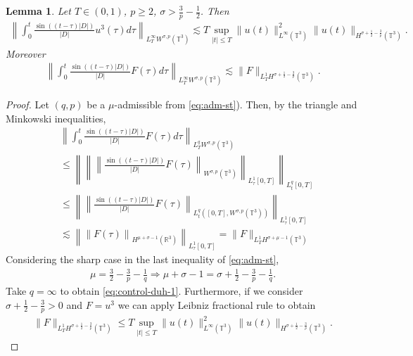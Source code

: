 \documentclass[a4paper, reqno, 11pt]{amsart}
\newtheorem{lemma}[theorem]{Lemma}
\theoremstyle{definition}
\begin{document}
	\begin{lemma}\label{lemma:infcontrol-duhamel-st}
	Let $T \in (0,1)$, $p \geq 2$, $\sigma > \frac{3}{p} - \frac{1}{2}$. Then
		\begin{align}\label{eq:control-duh}
			\left\| \int_0^t \frac{\sin((t-\tau)|D|)}{|D|} u^3(\tau) d\tau \right\|_{L^{\infty}_T W^{\sigma,p}(\mathbb{T}^3)} \lesssim T \sup_{|t| \leq T} \| u(t) \|_{L^{\infty}(\mathbb{T}^3)}^2 \|u(t)\|_{H^{\sigma + \frac{1}{2} - \frac{3}{p}}(\mathbb{T}^3)}.
		\end{align}
		Moreover
		\begin{align}\label{eq:control-duh-1}
		\left\| \int_0^t \frac{\sin((t-\tau)|D|)}{|D|} F(\tau) d\tau \right\|_{L^{\infty}_T W^{\sigma,p}(\mathbb{T}^3)} \lesssim  \|F\|_{L^1_T H^{\sigma + \frac{1}{2} - \frac{3}{p}}(\mathbb{T}^3)}.
		\end{align}
	\end{lemma}
	\begin{proof}
	Let $(q,p)$ be a $\mu$-admissible from \eqref{eq:adm-st}). Then, by the triangle and Minkowski inequalities,
	\begin{align*}
			&\left\| \int_0^t \frac{\sin((t-\tau)|D|)}{|D|} F(\tau) d\tau \right\|_{L^q_T W^{\sigma,p}(\mathbb{T}^3)}  \nonumber\\
			&\leq \left\| \left\| \left\|\frac{\sin((t-\tau)|D|)}{|D|} F(\tau)\right\|_{W^{\sigma,p}(\mathbb{T}^3)} \right\|_{L^1_{\tau}[0,T]} \right\|_{L^q_t[0,T]}  \nonumber\\
			&\leq \left\|  \left\|\frac{\sin((t-\tau)|D|)}{|D|} F(\tau)\right\|_{L^q_t([0,T],W^{\sigma,p}(\mathbb{T}^3))}  \right\|_{L^1_{\tau}[0,T]} \nonumber\\
			&\lesssim \left\| \left\| F(\tau) \right\|_{H^{\mu+\sigma-1}(\mathbb{R}^3)} \right\|_{L^1_{\tau}[0,T]} = \|F\|_{L^1_T H^{\sigma + \mu - 1}(\mathbb{T}^3)}
		\end{align*}
		Considering the sharp case in the last inequality of \eqref{eq:adm-st},
		\begin{align*}
		\mu = \frac{3}{2} - \frac{3}{p} - \frac{1}{q} \Longrightarrow \mu+\sigma-1 = \sigma + \frac{1}{2} - \frac{3}{p} - \frac{1}{q}.
		\end{align*}
		Take $q = \infty$ to obtain \eqref{eq:control-duh-1}. Furthermore, if we consider $\sigma + \frac{1}{2} - \frac{3}{p} > 0$ and $F = u^3$ we can apply Leibniz fractional rule \cite{grafakos_kp} to obtain
		\begin{align*}
		\|F\|_{L^1_T H^{\sigma + \frac{1}{2} - \frac{3}{p}}(\mathbb{T}^3)} \leq T \sup_{|t| \leq T} \|u(t)\|^2_{L^{\infty}(\mathbb{T}^3)} \|u(t)\|_{H^{\sigma + \frac{1}{2} - \frac{3}{p}}(\mathbb{T}^3)}.
		\end{align*}
	\end{proof}
	
\end{document}
